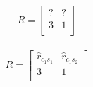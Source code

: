 $$
R=\begin{bmatrix}
    ? & ? \\
    3 & 1 \\
\end{bmatrix}
$$\\

$$
R=\begin{bmatrix}
    \hat{r}_{c_{1}s_{1}} & \hat{r}_{c_{1}s_{2}} \\
    3 & 1 \\
\end{bmatrix}
$$\\



